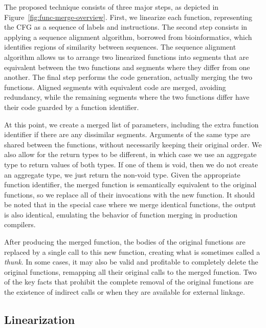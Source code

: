 The proposed technique consists of three major steps, as depicted in
Figure~\ref{fig:func-merge-overview}.
First, we linearize each function, representing the CFG as a sequence of
labels and instructions.
The second step consists in applying a sequence alignment algorithm, borrowed
from bioinformatics, which identifies regions of similarity between sequences.
The sequence alignment algorithm allows us to arrange two linearized functions
into segments that are equivalent between the two functions and segments where
they differ from one another.
The final step performs the code generation, actually merging the two functions.
Aligned segments with equivalent code are merged, avoiding redundancy, %
while the remaining segments where the two functions differ have their code guarded by a function identifier.

At this point, we create a merged list of parameters, including the extra function identifier if there are any
dissimilar segments. 
Arguments of the same type are shared between the functions, without necessarily keeping their original
order.
We also allow for the return types to be different, in which case we use an aggregate type to return values of both types.
If one of them is void, then we do not create an aggregate type, we just return the non-void type.
Given the appropriate function identifier, the merged function is semantically equivalent to the original functions,
so we replace all of their invocations with the new function.
It should be noted that in the special case where we merge identical functions, the output is also identical, emulating
the behavior of function merging in production compilers.

After producing the merged function, the bodies of the original functions are
replaced by a single call to this new function, creating what is sometimes
called a \textit{thunk}.
In some cases, it may also be valid and profitable to completely delete the
original functions, remapping all their original calls to the merged function.  
Two of the key facts that prohibit the complete removal of the original functions
are the existence of indirect calls or when they are available for
external linkage.
 
\subsection{Linearization}

